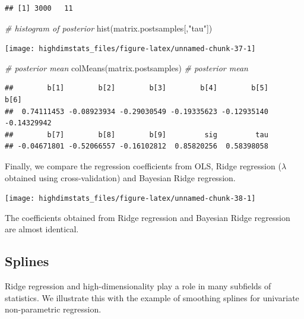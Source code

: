 \documentclass[
]{book}
\newenvironment{Shaded}{\begin{snugshade}}{\end{snugshade}}
\newcommand{\CommentTok}[1]{\textcolor[rgb]{0.56,0.35,0.01}{\textit{#1}}}
\newcommand{\FunctionTok}[1]{\textcolor[rgb]{0.00,0.00,0.00}{#1}}
\newcommand{\NormalTok}[1]{#1}
\newcommand{\StringTok}[1]{\textcolor[rgb]{0.31,0.60,0.02}{#1}}
\begin{document}
\begin{verbatim}
## [1] 3000   11
\end{verbatim}

\begin{Shaded}
\begin{Highlighting}[]
\CommentTok{\# histogram of posterior}
\FunctionTok{hist}\NormalTok{(matrix.postsamples[,}\StringTok{"tau"}\NormalTok{])}
\end{Highlighting}
\end{Shaded}

\begin{center}\texttt{[image: highdimstats\_files/figure-latex/unnamed-chunk-37-1]} \end{center}

\begin{Shaded}
\begin{Highlighting}[]
\CommentTok{\# posterior mean}
\FunctionTok{colMeans}\NormalTok{(matrix.postsamples) }\CommentTok{\# posterior mean}
\end{Highlighting}
\end{Shaded}

\begin{verbatim}
##        b[1]        b[2]        b[3]        b[4]        b[5]        b[6] 
##  0.74111453 -0.08923934 -0.29030549 -0.19335623 -0.12935140 -0.14329942 
##        b[7]        b[8]        b[9]         sig         tau 
## -0.04671801 -0.52066557 -0.16102812  0.85820256  0.58398058
\end{verbatim}

Finally, we compare the regression coefficients from OLS, Ridge regression (\(\lambda\) obtained using cross-validation) and Bayesian Ridge regression.

\begin{center}\texttt{[image: highdimstats\_files/figure-latex/unnamed-chunk-38-1]} \end{center}

The coefficients obtained from Ridge regression and Bayesian Ridge regression are almost identical.

\hypertarget{splines}{%
\subsection{Splines}\label{splines}}

Ridge regression and high-dimensionality play a role in many subfields of statistics. We illustrate this with the example of smoothing splines for univariate non-parametric regression.
\end{document}
